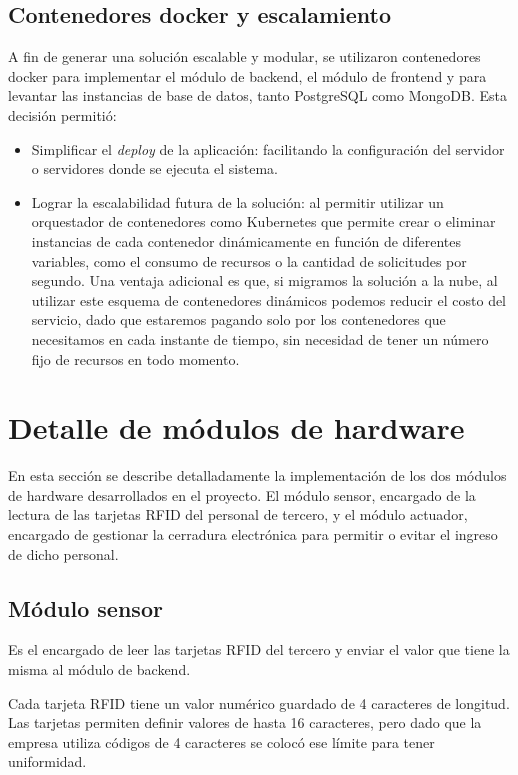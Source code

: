 \subsection{Contenedores docker y escalamiento}

A fin de generar una solución escalable y modular, se utilizaron contenedores docker para implementar el módulo de backend, el módulo de frontend y para levantar las instancias de base de datos, tanto PostgreSQL como MongoDB. Esta decisión permitió:

\begin{itemize}
\item Simplificar el \textit{deploy} de la aplicación: facilitando la configuración del servidor o servidores donde se ejecuta el sistema.
\item Lograr la escalabilidad futura de la solución: al permitir utilizar un orquestador de contenedores como Kubernetes que permite crear o eliminar instancias de cada contenedor dinámicamente en función de diferentes variables, como el consumo de recursos o la cantidad de solicitudes por segundo. Una ventaja adicional es que, si migramos la solución a la nube, al utilizar este esquema de contenedores dinámicos podemos reducir el costo del servicio, dado que estaremos pagando solo por los contenedores que necesitamos en cada instante de tiempo, sin necesidad de tener un número fijo de recursos en todo momento.
\end{itemize}

\pagebreak
\section{Detalle de módulos de hardware}

En esta sección se describe detalladamente la implementación de los dos módulos de hardware desarrollados en el proyecto. El módulo sensor, encargado de la lectura de las tarjetas RFID del personal de tercero, y el módulo actuador, encargado de gestionar la cerradura electrónica para permitir o evitar el ingreso de dicho personal.

\subsection{Módulo sensor}

Es el encargado de leer las tarjetas RFID del tercero y enviar el valor que tiene la misma al módulo de backend.

Cada tarjeta RFID tiene un valor numérico guardado de 4 caracteres de longitud. Las tarjetas permiten definir valores de hasta 16 caracteres, pero dado que la empresa utiliza códigos de 4 caracteres se colocó ese límite para tener uniformidad.

